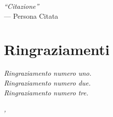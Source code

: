 
\cleardoublepage
{}
{}

\begin{flushright}{ %
	\slshape
	``Citazione''} \\
	\medskip
    --- Persona Citata
\end{flushright}


\bigskip

\begingroup
\let\clearpage\relax
\let\cleardoublepage\relax
\let\cleardoublepage\relax

\chapter*{Ringraziamenti}

\noindent \textit{Ringraziamento numero uno.}\\

\noindent \textit{Ringraziamento numero due.}\\

\noindent \textit{Ringraziamento numero tre.}\\
\bigskip

\noindent\textit{\myLocation, \myTime}
\hfill \myName

\endgroup
